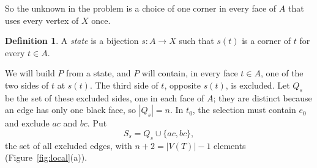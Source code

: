 \documentclass[10pt]{amsart}
\numberwithin{equation}{section}
\theoremstyle{definition}
\newtheorem{definition}[equation]{Definition}
\theoremstyle{remark}
\newcommand{\T}{T}
\begin{document}
So the unknown in the problem is a choice of one corner in every face of $A$ that uses every vertex of $X$ once.

\begin{definition}
A \emph{state} is a bijection $s\colon A\to X$ such that $s(t)$ is a corner of $t$ for every $t\in A$.
\end{definition}

We will build $P$ from a state, and $P$ will contain, in every face $t\in A$, one of the two sides of $t$ at $s(t)$.
The third side of $t$, opposite $s(t)$, is excluded.
Let $Q_s$ be the set of these excluded sides, one in each face of $A$; they are distinct because an edge has only one black face, so $|Q_s|=n$.
In $t_0$, the selection must contain $e_0$ and exclude $ac$ and $bc$.
Put
\[
S_s=Q_s\cup\{ac,bc\},
\]
the set of all excluded edges, with $n+2=|V(\T)|-1$ elements (Figure~\ref{fig:local}(a)).
\end{document}
